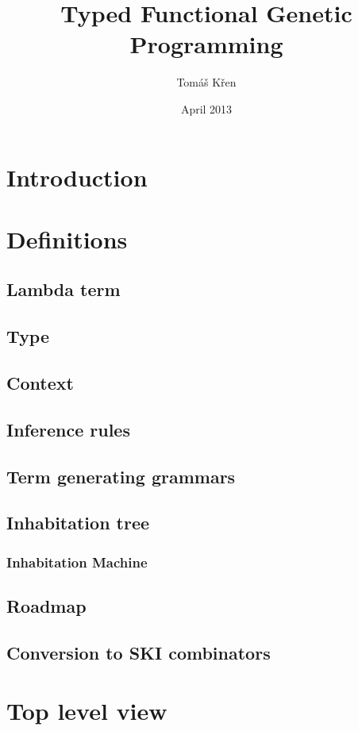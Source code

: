 \documentclass[12pt]{article}
\title{Typed Functional Genetic Programming}
\author{Tomáš Křen}
\date{April 2013}
\begin{document}
	\maketitle
	
	


	\section{Introduction}
	
	\section{Definitions}
		\subsection{Lambda term}
		\subsection{Type}
		\subsection{Context}
		\subsection{Inference rules}
		\subsection{Term generating grammars}
		\subsection{Inhabitation tree}
			\subsubsection{Inhabitation Machine}
		\subsection{Roadmap}
		\subsection{Conversion to SKI combinators}

	\section{Top level view}
	
\end{document}
